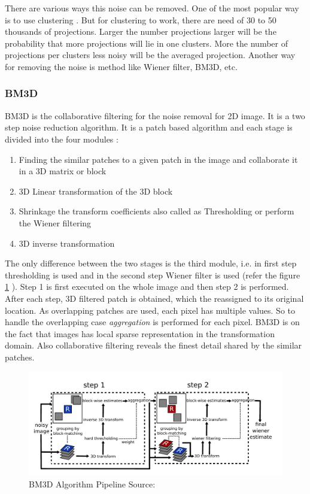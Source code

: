 \documentclass{report}
\begin{document}
There are various ways this noise can be removed. One of the most popular way is to use clustering \cite{mallick2006structure}. But for clustering to work, there are need of 30 to 50 thousands of projections. Larger the number projections larger will be the probability that more projections will lie in one clusters. More the number of projections per clusters less noisy will be the averaged projection. Another way for removing the noise is method like Wiener filter, BM3D, etc.

\subsubsection{BM3D}\label{subsubsec:BM3D}
BM3D \cite{dabov2009BM3D}\cite{lebrun2012BM3Danalysis} is the collaborative filtering for the noise removal for 2D image. It is a two step noise reduction algorithm. It is a patch based algorithm and each stage is divided into the four modules :
\begin{enumerate}
  \item Finding the similar patches to a given patch in the image and collaborate it in a 3D matrix or block
  \item 3D Linear transformation of the 3D block
  \item Shrinkage the transform coefficients also called as Thresholding or perform the Wiener filtering
  \item 3D inverse transformation
\end{enumerate}

The only difference between the two stages is the third module, i.e. in first step thresholding is used and in the second step  Wiener filter is used (refer the figure \ref{fig: bm3d} ). Step 1 is first executed on the whole image and then step 2 is performed. After each step, 3D filtered patch is obtained, which the reassigned to its original location. As overlapping patches are used, each pixel has multiple values. So to handle the overlapping case \textit{aggregation} is performed for each pixel. BM3D is on the fact that images has local sparse  representation in the transformation domain. Also collaborative filtering reveals the finest detail shared by the similar patches.


\begin{figure}[h]
\includegraphics[width=0.9\linewidth]{bm3d.png}
\centering
\captionsetup{justification=centering}
\caption{ BM3D Algorithm Pipeline Source: \cite{lebrun2012BM3Danalysis} }
\label{fig: bm3d}
\end{figure}
\end{document}
